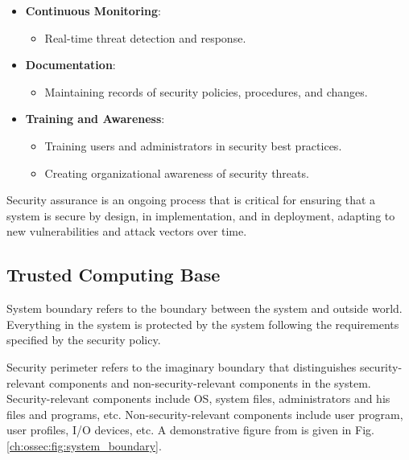 \begin{itemize}
	\item \textbf{Continuous Monitoring}:
	\begin{itemize}
		\item Real-time threat detection and response.
	\end{itemize}
	
	\item \textbf{Documentation}:
	\begin{itemize}
		\item Maintaining records of security policies, procedures, and changes.
	\end{itemize}
	
	\item \textbf{Training and Awareness}:
	\begin{itemize}
		\item Training users and administrators in security best practices.
		\item Creating organizational awareness of security threats.
	\end{itemize}
\end{itemize}

Security assurance is an ongoing process that is critical for ensuring that a system is secure by design, in implementation, and in deployment, adapting to new vulnerabilities and attack vectors over time.

\subsection{Trusted Computing Base}

System boundary refers to the boundary between the system and outside world. Everything in the system is protected by the system following the requirements specified by the security policy. 

Security perimeter refers to the imaginary boundary that distinguishes security-relevant components and non-security-relevant components in the system. Security-relevant components include OS, system files, administrators and his files and programs, etc. Non-security-relevant components include user program, user profiles, I/O devices, etc. A demonstrative figure from \cite{gasser1988building} is given in Fig. \ref{ch:ossec:fig:system_boundary}. 

